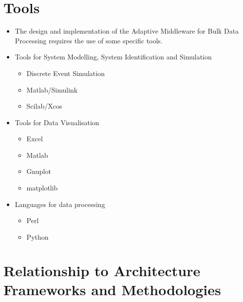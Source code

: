 \section{Tools} %
\label{sec:ch6_tools}

\begin{itemize}
	\item The design and implementation of the Adaptive Middleware for Bulk Data Processing requires the use of some specific tools.
\end{itemize}

\begin{itemize}
	\item Tools for System Modelling, System Identification and Simulation
	\begin{itemize}
		\item Discrete Event Simulation
		\item Matlab/Simulink
		\item Scilab/Xcos
	\end{itemize}
	\item Tools for Data Visualisation
	\begin{itemize}
		\item Excel
		\item Matlab
		\item Gnuplot
		\item matplotlib
	\end{itemize}
	\item Languages for data processing
	\begin{itemize}
		\item Perl
		\item Python
	\end{itemize}
\end{itemize}


\section{Relationship to Architecture Frameworks and Methodologies} 
\label{sec:ch6_other_frameworks}

